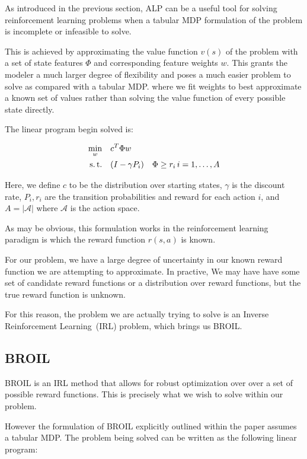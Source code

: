 \documentclass{article}
\begin{document}
As introduced in the previous section, ALP can be a useful tool for solving reinforcement learning problems when a tabular MDP formulation of the problem is incomplete or infeasible to solve.

This is achieved by approximating the value function $v(s)$ of the problem with a set of state features $\Phi$ and corresponding feature weights $w$. This grants the modeler a much larger degree of flexibility and poses a much easier problem to solve as compared with a tabular MDP. where we fit weights to best approximate a known set of values rather than solving the value function of every possible state directly.

The linear program begin solved is:

\begin{equation}
\begin{aligned}
\min_{w} \quad &c^T\Phi w\\
\text{s.\,t.}\quad & (I - \gamma P_i) \quad \Phi \ge r_{i} \, i=1,\ldots,A
\end{aligned}
\end{equation}

Here, we define $c$ to be the distribution over starting states, $\gamma$ is the discount rate, $P_i, r_i$ are the transition probabilities and reward for each action $i$, and $A = |\mathcal{A}|$ where $\mathcal{A}$ is the action space.

As may be obvious, this formulation works in the reinforcement learning paradigm is which the reward function $r(s,a)$ is known.

For our problem, we have a large degree of uncertainty in our known reward function we are attempting to approximate. In practive, We may have have some set of candidate reward functions or a distribution over reward functions, but the true reward function is unknown. 

For this reason, the problem we are actually trying to solve is an Inverse Reinforcement Learning~(IRL) problem, which brings us BROIL\cite{brown2020bayesian}.

\subsection{BROIL}

BROIL is an IRL method that allows for robust optimization over over a set of possible reward functions. This is precisely what we wish to solve within our problem.

However the formulation of BROIL explicitly outlined within the paper assumes a tabular MDP. The problem being solved can be written as the following linear program:
\end{document}
